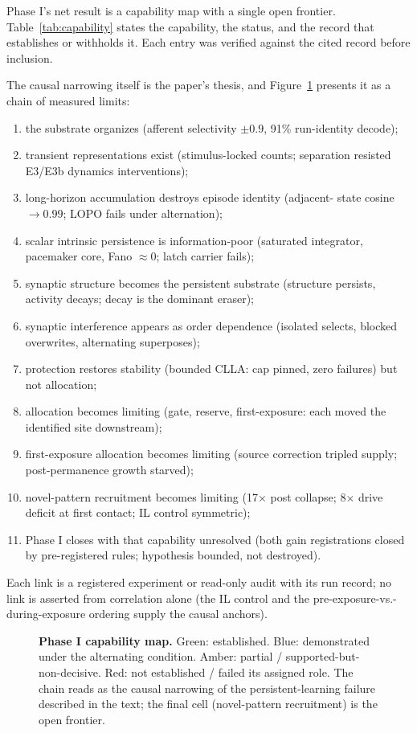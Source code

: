 Phase I's net result is a capability map with a single open frontier.
Table~\ref{tab:capability} states the capability, the status, and the
record that establishes or withholds it. Each entry was verified
against the cited record before inclusion.



The causal narrowing itself is the paper's thesis, and
Figure~\ref{fig:capmap} presents it as a chain of measured limits:

\begin{enumerate}
\item the substrate organizes (afferent selectivity \(\pm 0.9\),
  91\% run-identity decode);
\item transient representations exist (stimulus-locked counts;
  separation resisted E3/E3b dynamics interventions);
\item long-horizon accumulation destroys episode identity (adjacent-
  state cosine \(\to 0.99\); LOPO fails under alternation);
\item scalar intrinsic persistence is information-poor (saturated
  integrator, pacemaker core, Fano \(\approx 0\); latch carrier fails);
\item synaptic structure becomes the persistent substrate
  (structure persists, activity decays; decay is the dominant eraser);
\item synaptic interference appears as order dependence (isolated
  selects, blocked overwrites, alternating superposes);
\item protection restores stability (bounded CLLA: cap pinned, zero
  failures) but not allocation;
\item allocation becomes limiting (gate, reserve, first-exposure:
  each moved the identified site downstream);
\item first-exposure allocation becomes limiting (source correction
  tripled supply; post-permanence growth starved);
\item novel-pattern recruitment becomes limiting (17\(\times\) post
  collapse; 8\(\times\) drive deficit at first contact; IL control
  symmetric);
\item Phase I closes with that capability unresolved (both gain
  registrations closed by pre-registered rules; hypothesis bounded,
  not destroyed).
\end{enumerate}

Each link is a registered experiment or read-only audit with its run
record; no link is asserted from correlation alone (the IL control and
the pre-exposure-vs.-during-exposure ordering supply the causal
anchors).

\begin{figure}[t]
\centering

\caption{\textbf{Phase I capability map.} Green: established.
Blue: demonstrated under the alternating condition. Amber: partial /
supported-but-non-decisive. Red: not established / failed its assigned
role. The chain reads as the causal narrowing of the persistent-learning
failure described in the text; the final cell (novel-pattern
recruitment) is the open frontier.}
\label{fig:capmap}
\end{figure}
